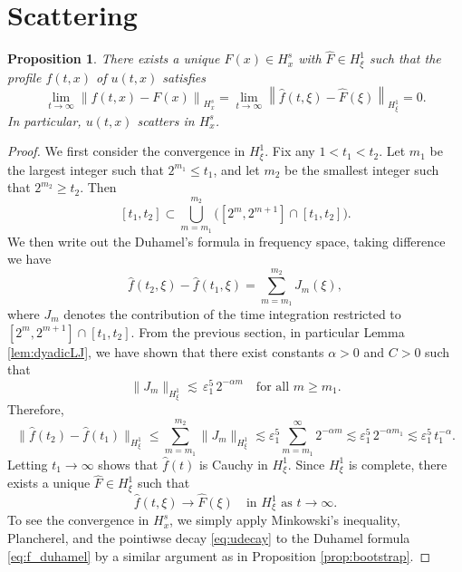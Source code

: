 \documentclass[reqno,english,11pt]{amsart}
\newcommand{\eps}{\varepsilon}
\newcommand{\snorm}[1]{\left\|#1\right\|}
\newtheorem{proposition}[theorem]{Proposition}
\theoremstyle{definition}
\numberwithin{equation}{section}
\begin{document}
\section{Scattering}
\begin{proposition}\label{prop:scattering}
    There exists a unique $F(x)\in H^s_x$ with $\widehat{F}\in  H^1_\xi$ such that the profile $f(t,x)$ of $u(t,x)$ satisfies
    $$\lim_{t\to \infty}\snorm{f(t,x)-F(x)}_{H^s_x}=\lim_{t\to \infty}\snorm{\widehat{f}(t,\xi)-\widehat{F}(\xi)}_{H^1_\xi}=0.$$
    In particular, $u(t,x)$ scatters in $H^s_x$. 
\end{proposition}
\begin{proof}
We first consider the convergence in $H^1_\xi$.   
Fix any $1<t_1<t_2$. Let $m_1$ be the largest integer such that $2^{m_1}\le t_1$, and let $m_2$ be the smallest integer such that $2^{m_2}\ge t_2$. 
Then
$$
[t_1,t_2]\subset \bigcup_{m=m_1}^{m_2}\big([2^m,2^{m+1}]\cap [t_1,t_2]\big).
$$
We then write out the Duhamel's formula in frequency space, taking difference we have
$$
\widehat f(t_2,\xi)-\widehat f(t_1,\xi)=\sum_{m=m_1}^{m_2} J_m(\xi),
$$
where $J_m$ denotes the contribution of the time integration restricted to $[2^m,2^{m+1}]\cap [t_1,t_2]$. 
From the previous section, in particular Lemma \ref{lem:dyadicLJ}, we have shown that there exist constants $\alpha>0$ and $C>0$ such that
$$
\|J_m\|_{H^1_\xi}\lesssim\,\eps_1^5\,2^{-\alpha m}
\quad\text{for all } m\ge m_1.
$$
Therefore,
$$
\|\widehat f(t_2)-\widehat f(t_1)\|_{H^1_\xi}
\le \sum_{m=m_1}^{m_2}\|J_m\|_{H^1_\xi}
\lesssim \eps_1^5\sum_{m=m_1}^{\infty}2^{-\alpha m}
\lesssim \eps_1^5\,2^{-\alpha m_1}
\lesssim \eps_1^5\,t_1^{-\alpha}.
$$
Letting $t_1\to\infty$ shows that $\widehat f(t)$ is Cauchy in $H^1_\xi$. 
Since $H^1_\xi$ is complete, there exists a unique $\widehat F\in H^1_\xi$ such that
$$
\widehat f(t,\xi)\to \widehat F(\xi)\quad\text{in }H^1_\xi \text{ as } t\to\infty.
$$
To see the convergence in  $H^s_x$, we simply apply Minkowski's inequality, Plancherel, and the pointiwse decay \eqref{eq:udecay} to the Duhamel formula \eqref{eq:f_duhamel} by a similar argument as in Proposition \ref{prop:bootstrap}.
\end{proof}


\end{document}
